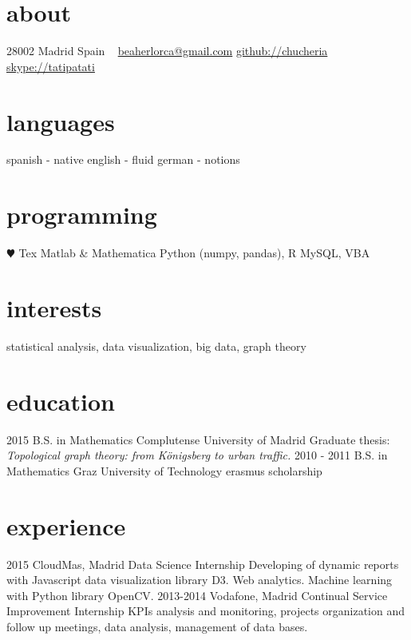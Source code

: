 \documentclass[]{friggeri-cv}
\begin{document}
\ifenglish
{}
       {}


\begin{aside}
  \section{about}
    28002 Madrid
    Spain
    ~
    \href{mailto:beaherlorca@gmail.com}{beaherlorca@gmail.com}
    \href{https://github.com/chucheria}{github://chucheria}
    \href{<a href="skype:tatipatati?chat">}{skype://tatipatati}
  \section{languages}
    spanish - native
    english - fluid
    german - notions
  \section{programming}
    {\color{red} $\varheartsuit$} Tex
    Matlab \& Mathematica
    Python (numpy, pandas), R
    MySQL, VBA
\end{aside}

\section{interests}

statistical analysis, data visualization, big data, graph theory


\section{education}

\begin{entrylist}
  \entry
    {2015}
    {B.S. in Mathematics}
    {Complutense University of Madrid}
    {Graduate thesis: \emph{Topological graph theory: from Königsberg to urban traffic.}}
  \entry
    {2010 - 2011}
    {B.S. in Mathematics}
    {Graz University of Technology}
    {erasmus scholarship}
\end{entrylist}

\section{experience}

\begin{entrylist}
  \entry
    {2015}
    {CloudMas, Madrid}
    {Data Science Internship}
    {Developing of dynamic reports with Javascript data visualization library D3. Web analytics. Machine learning with Python library OpenCV.}
  \entry
    {2013-2014}
    {Vodafone, Madrid}
    {Continual Service Improvement Internship}
    {KPIs analysis and monitoring, projects organization and follow up meetings, data analysis, management of data bases.}
\end{entrylist}
\end{document}
